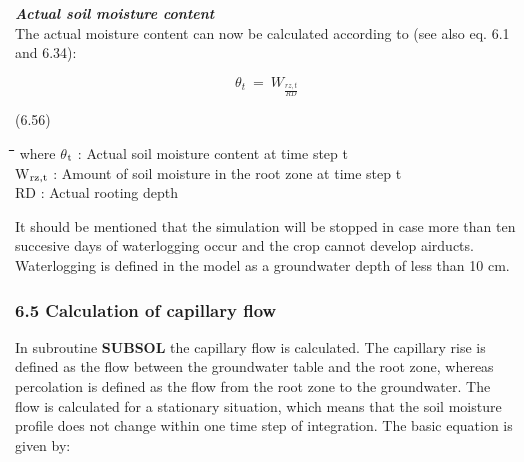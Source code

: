 \documentclass[11pt]{article}
\begin{document}
\bigskip
\bigskip
\bigskip
\bigskip
 {\bf {\it Actual soil moisture content\/}}\\
The actual moisture content can now be calculated according to (see also eq. 6.1 and
6.34):

\begin{displaymath}
\theta _{t} ~=~ W _{\frac{rz, t}{RD}} 
\end{displaymath}

 \bigskip
\strut\hfill (6.56)\\
\strut\hfill 
\nwln
\begin{tabbing}
\hspace{1.27cm}\=\hspace{1.27cm}\=\hspace{1.27cm}\=\hspace{1.27cm}\=%
\hspace{1.27cm}\=\hspace{1.27cm}\=\hspace{1.27cm}\=\hspace{1.27cm}\=%
\hspace{1.27cm}\=\hspace{1.27cm}\=\kill
where\> $\theta$$_{{\rm t}}$\> : Actual soil moisture content at time step t\> \> \> \> \> \> \> \> [cm$^{{\rm 3}}$ cm$^{{\rm -3}}$]\\
\>W$_{{\rm rz,t}}$\> : Amount of soil moisture in the root zone at time step t\> \> \> \> \> \> \> \> [cm]\\
\>RD\> : Actual rooting depth\> \> \> \> \> \> \> \> [cm]
\end{tabbing}

\bigskip
\bigskip
It should be mentioned that the simulation will be stopped in case more than ten succesive
days of waterlogging occur and the crop cannot develop airducts. Waterlogging is defined
in the model as a groundwater depth of less than 10 cm.
\newpage

\subsubsection{  6.5 Calculation of capillary flow  }

In subroutine {\bf SUBSOL} the capillary flow is calculated. The capillary rise is defined as
the flow between the groundwater table and the root zone, whereas  percolation is defined
as the flow from the root zone to the groundwater. The flow is calculated for a stationary
situation, which means that the soil moisture profile does not change within one time step
of integration. The basic equation is given by:
\end{document}
